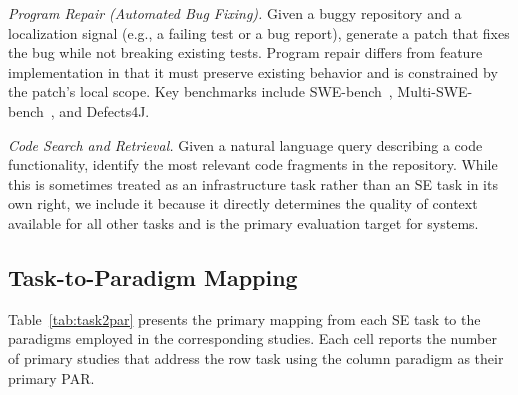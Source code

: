 \begin{description}[leftmargin=2.5em, labelwidth=2.5em]
\item[\textbf{T6:}] \textit{Program Repair (Automated Bug Fixing).} Given a buggy repository
  and a localization signal (e.g., a failing test or a bug report), generate a patch that
  fixes the bug while not breaking existing tests. Program repair differs from feature
  implementation in that it must preserve existing behavior and is constrained by the
  patch's local scope. Key benchmarks include SWE-bench~\cite{jimenez2024swebench},
  Multi-SWE-bench~\cite{zan2025multiswebench}, and Defects4J.

\item[\textbf{T7:}] \textit{Code Search and Retrieval.} Given a natural language query
  describing a code functionality, identify the most relevant code fragments in the repository.
  While this is sometimes treated as an infrastructure task rather than an SE task in its own
  right, we include it because it directly determines the quality of context available for all
  other tasks and is the primary evaluation target for  systems.

\end{description}

\subsection{Task-to-Paradigm Mapping}
\label{subsec:task2par}

Table~\ref{tab:task2par} presents the primary mapping from each SE task to the paradigms
employed in the corresponding studies. Each cell reports the number of primary studies that
address the row task using the column paradigm as their primary PAR.

